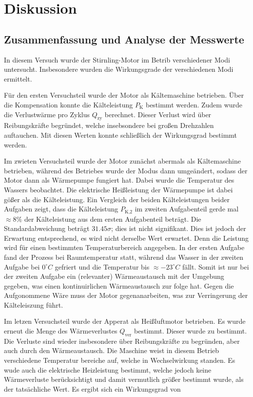 \chapter{Diskussion}
\label{ch:Diskussion}

\section{Zusammenfassung und Analyse der Messwerte}
\label{sec:Zusammenfassung}
In diesem Versuch wurde der Stirnling-Motor im Betrib verschiedener Modi untersucht. Insbesondere wurden die Wirkungsgrade der verschiedenen Modi ermittelt.

Für den ersten Versuchsteil wurde der Motor als Kältemaschine betrieben. Über die Kompensation konnte die Kälteleistung $P_\text{K}$ bestimmt werden. Zudem wurde die Verlustwärme pro Zyklus $Q_\text{zy}$ berechnet. Dieser Verlust wird über Reibungskräfte begründet, welche insebsondere bei großen Drehzahlen auftauchen. Mit diesen Werten konnte schließlich der Wirkungsgrad
bestimmt werden.

Im zwieten Versuchsteil wurde der Motor zunächst abermals als Kältemaschine betrieben, während des Betriebes wurde der Modus dann umgeändert, sodass der Motor dann als Wärmepumpe fungiert hat. Dabei wurde die Temperatur des Wassers beobachtet. Die elektrische Heißleistung der Wärmepumpe ist dabei gößer als die Kälteleistung. Ein Vergleich der beiden Kälteleistungen beider Aufgaben zeigt, dass die Kälteleistung $P_\text{K,2}$ im zweiten Aufgabenteil gerde mal $\approx 8 \%$ der Kälteleistung aus dem ersten Aufgabenteil beträgt. Die Standardabweichung beträgt $31.45\sigma$; dies ist nicht signifikant.
Dies ist jedoch der Erwartung entsprechend, es wird nicht derselbe Wert erwartet. Denn die Leistung wird für einen bestimmten Temperaturbereich angegeben. In der ersten Aufgabe fand der Prozess bei Raumtemperatur statt, während das Wasser in der zweiten Aufgabe bei $0^\circ C$ gefriert und die Temperatur bis $\approx - 23^\circ C$ fällt. Somit ist nur bei der zweiten Aufgabe ein (relevanter) Wärmeaustausch mit der Umgebung gegeben, was einen kontinuirlichen Wärmeaustausch zur folge hat. Gegen die Aufgonommene Wäre muss der Motor gegenanarbeiten, was zur Verringerung der Kälteleiszung führt.

Im letzen Versuchsteil wurde der Apperat als Heißluftmotor betrieben. Es wurde erneut die Menge des Wärmeverlustes $Q_\text{ver}$ bestimmt. Dieser wurde zu 
bestimmt. Die Verluste sind wieder insbesondere über Reibungskräfte zu begründen, aber auch durch den Wärmeaustausch. Die Maschine weist in diesem Betrieb verschiedene Temperatur bereiche auf, welche in Wechselwirkung standen. Es wude auch die elektrische Heizleistung bestimmt, welche jedoch keine Wärmeverluste berücksichtigt und damit vermutlich größer bestimmt wurde, als der tatsächliche Wert. 
Es ergibt sich ein Wirkungsgrad von

